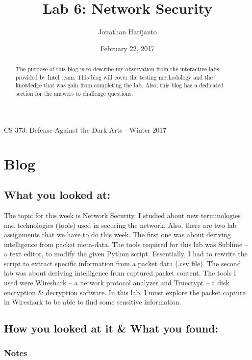 \documentclass[letterpaper,10pt,titlepage,draftclsnofoot,onecolumn]{IEEEtran}
\title{Lab 6: Network Security}
\author{Jonathan Harijanto}
\date{February 22, 2017}
\begin{document}
\maketitle
\begin{center}
CS 373: Defense Against the Dark Arts - Winter 2017
\vfill
\end{center}

\begin{abstract}

The purpose of this blog is to describe my observation from the interactive labs provided by Intel team.
This blog will cover the testing methodology and the knowledge that was gain from completing the lab.
Also, this blog has a dedicated section for the answers to challenge questions.

\end{abstract}
\newpage

\section{Blog} 

\subsection{What you looked at:}

The topic for this week is Network Security. 
I studied about new terminologies and technologies (tools) used in securing the network. 
Also, there are two lab assignments that we have to do this week.
The first one was about deriving intelligence from packet meta-data.
The tools required for this lab was Sublime -- a text editor, to modify the given Python script.
Essentially, I had to rewrite the script to extract specific information from a packet data (.csv file). 
The second lab was about deriving intelligence from captured packet content. 
The tools I used were Wireshark -- a network protocol analyzer and Truecrypt -- a disk encryption \& decryption software.
In this lab, I must explore the packet capture in Wireshark to be able to find some sensitive information.

\subsection{How you looked at it \& What you found:}

\subsubsection{Notes}
\hfill\\
\end{document}
